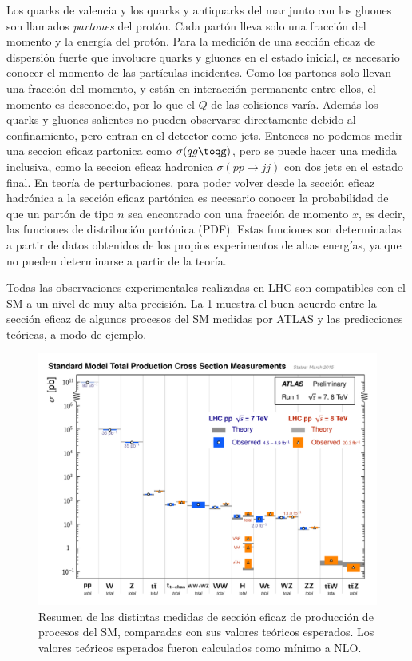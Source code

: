 Los quarks de valencia y los quarks y antiquarks del mar junto con los gluones
son llamados \emph{partones} del protón. Cada partón lleva solo una fracción del
momento y la energía del protón. Para la medición de una sección eficaz de
dispersión fuerte que involucre quarks y gluones en el estado inicial, es
necesario conocer el momento de las partículas incidentes. Como los partones
solo llevan una fracción del momento, y están en interacción permanente entre
ellos, el momento es desconocido, por lo que el $Q$ de las colisiones varía.
Además los quarks y gluones salientes no pueden observarse directamente debido
al confinamiento, pero entran en el detector como jets. Entonces no podemos
medir una seccion eficaz partonica como $\sigma(qg\toqg)$, pero se puede hacer
una medida inclusiva, como la seccion eficaz hadronica $\sigma(pp\to jj)$ con
dos jets en el estado final. En teoría de perturbaciones, para poder volver
desde la sección eficaz hadrónica a la sección eficaz partónica es necesario
conocer la probabilidad de que un partón de tipo $n$ sea encontrado con una
fracción de momento $x$, es decir, las funciones de distribución partónica
(PDF). Estas funciones son determinadas a partir de datos obtenidos de los
propios experimentos de altas energías, ya que no pueden determinarse a partir
de la teoría.

Todas las observaciones experimentales realizadas en LHC son compatibles con el SM a un nivel de
muy alta precisión.
La \cref{fig:sm_atlas_xs} muestra el buen acuerdo entre la
sección eficaz de algunos procesos del SM medidas por ATLAS y las predicciones
teóricas, a modo de ejemplo.

\begin{figure}[!htb]
  \centering
  \includegraphics[width=1\textwidth]{figures/ATLAS_a_SMSummary_TotalXsect.pdf}
  \caption{Resumen de las distintas medidas de sección eficaz de producción de
    procesos del SM, comparadas con sus valores teóricos esperados.
    Los valores teóricos esperados fueron calculados como mínimo a NLO\cite{ATLASSM}.}
  \label{fig:sm_atlas_xs}
\end{figure}



